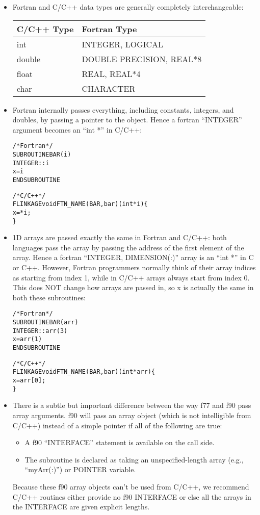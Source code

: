 \begin{itemize}

\item Fortran and C/C++ data types are generally completely
interchangeable:

\begin{tabular}{|l|l|}
\hline
\textbf{C/C++ Type} & \textbf{Fortran Type} \\
\hline
int & INTEGER, LOGICAL \\
double & DOUBLE PRECISION, REAL*8 \\
float & REAL, REAL*4 \\
char & CHARACTER \\
\hline
\end{tabular}

\item Fortran internally passes everything, including 
constants, integers, and doubles, by passing a pointer
to the object.  Hence a fortran ``INTEGER'' argument becomes 
an ``int *'' in C/C++:
\begin{alltt}
/* Fortran */
SUBROUTINE BAR(i) 
    INTEGER :: i
    x=i
END SUBROUTINE

/* C/C++ */
FLINKAGE void FTN\_NAME(BAR,bar)(int *i) \{
    x=*i;
\}
\end{alltt}

\item 1D arrays are passed exactly the same in Fortran and C/C++:
both languages pass the array by passing the address of the 
first element of the array.
Hence a fortran ``INTEGER, DIMENSION(:)'' array is an ``int *''
in C or C++.  However, Fortran programmers normally think of 
their array indices as starting from index 1, while in C/C++ 
arrays always start from index 0.  This does NOT change how 
arrays are passed in, so x is actually the same in both 
these subroutines:
\begin{alltt}
/* Fortran */
SUBROUTINE BAR(arr) 
    INTEGER :: arr(3)
    x=arr(1)
END SUBROUTINE

/* C/C++ */
FLINKAGE void FTN\_NAME(BAR,bar)(int *arr) \{
    x=arr[0];
\}
\end{alltt}

\item There is a subtle but important difference between the way
f77 and f90 pass array arguments.  f90 will pass an array object
(which is not intelligible from C/C++) instead of a simple pointer 
if all of the following are true:
\begin{itemize}
\item A f90 ``INTERFACE'' statement is available on the call side.
\item The subroutine is declared as taking an unspecified-length
       array (e.g., ``myArr(:)'') or POINTER variable.
\end{itemize}
Because these f90 array objects can't be used from C/C++, we recommend 
C/C++ routines either provide no f90 INTERFACE or else all the arrays 
in the INTERFACE are given explicit lengths.


\end{itemize}
